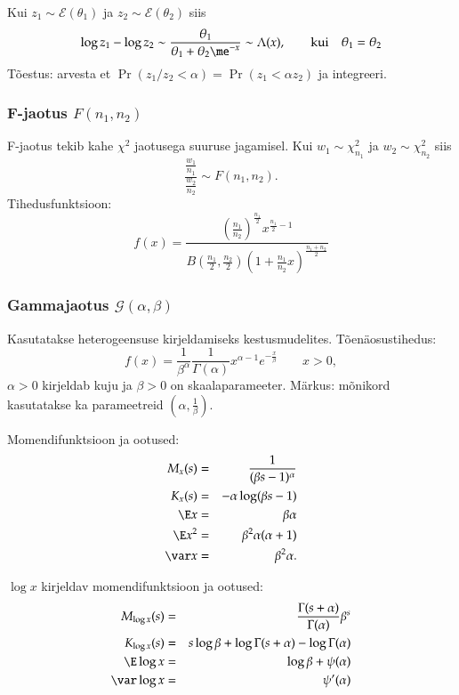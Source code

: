 \documentclass[a4paper]{article}
\numberwithin{equation}{subsection}
\begin{document}
Kui $z_1 \sim \mathcal{E}(\theta_1)$ ja $z_2 \sim
\mathcal{E}(\theta_2)$ siis
\begin{equation}
  \log z_1 - \log z_2 \sim \frac{\theta_1}{\theta_1 + \theta_2
  \me^{-x}} \sim \Lambda(x), \qquad \mbox{kui} \quad \theta_1 = \theta_2
\end{equation}
Tõestus: arvesta et $\Pr(z_1/z_2 < \alpha) = \Pr(z_1 < \alpha z_2)$ ja
integreeri. 


\subsubsection{F-jaotus $F(n_1, n_2)$}
F-jaotus tekib kahe $\chi^2$ jaotusega suuruse jagamisel.  Kui $w_1
\sim \chi_{n_1}^2$ ja $w_2 \sim \chi_{n_2}^2$ siis
\begin{equation}
\frac{\frac{w_1}{n_1}} {\frac{w_2}{n_2}} \sim F( n_1, n_2).
\end{equation}
Tihedusfunktsioon:
\begin{equation}
f(x) = \frac{
  \left(\frac{n_1}{n_2}\right)^\frac{n_1}{2} x^{\frac{n_1}{2}-1}}
  {B\left( \frac{n_1}{2}, \frac{n_2}{2} \right)
    \left( 1 + \frac{n_1}{n_2}x\right)^\frac{n_1+n_2}{2} }
\end{equation}


\subsubsection{Gammajaotus $\mathcal{G(\alpha,\beta)}$}
Kasutatakse heterogeensuse kirjeldamiseks kestusmudelites.
Tõenäosustihedus:
\begin{equation}
f(x) = \frac{1}{\beta^\alpha} \frac{1}{\Gamma( \alpha)} x^{\alpha-1}
  e^{-\frac{x}{\beta}} \qquad x > 0,
\end{equation}
$\alpha >0$ kirjeldab kuju ja $\beta>0$ on skaalaparameeter.  Märkus:
mõnikord kasutatakse ka parameetreid $(\alpha,\frac{1}{\beta})$.

Momendifunktsioon ja ootused:
\begin{eqnarray}
M_x (s) &=& \frac{1}{(\beta s - 1)^\alpha}\\
K_x (s) &=& -\alpha \log(\beta s - 1)\\
\E x &=& \beta \alpha \\
\E x^2 &=& \beta^2 \alpha( \alpha + 1) \\
\var x &=& \beta^2 \alpha.
\end{eqnarray}

$\log x$ kirjeldav momendifunktsioon ja ootused:
\begin{eqnarray}
M_{\log x} (s) &=& \frac{\Gamma(s + \alpha)}{\Gamma(\alpha)}\beta^s\\
K_{\log x} (s) &=& s\log \beta + \log \Gamma(s + \alpha) -
  \log\Gamma(\alpha)\\
\E\log x &=& \log\beta + \psi(\alpha)\\
\var\log x &=& \psi'(\alpha)
\end{eqnarray}
\end{document}
